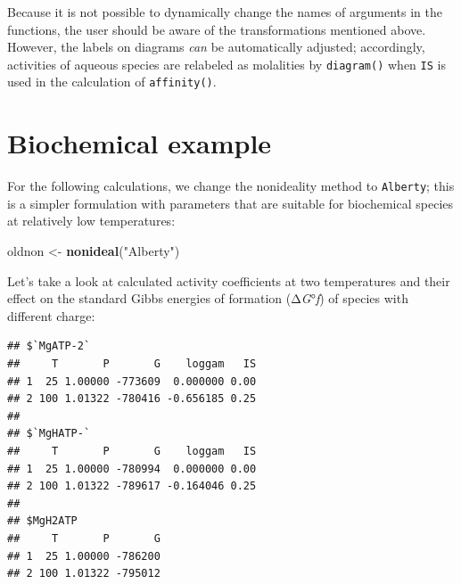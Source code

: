 \documentclass[]{tufte-book}
\newenvironment{Shaded}{}{}
\newcommand{\KeywordTok}[1]{\textcolor[rgb]{0.00,0.44,0.13}{\textbf{#1}}}
\newcommand{\DataTypeTok}[1]{\textcolor[rgb]{0.56,0.13,0.00}{#1}}
\newcommand{\DecValTok}[1]{\textcolor[rgb]{0.25,0.63,0.44}{#1}}
\newcommand{\FloatTok}[1]{\textcolor[rgb]{0.25,0.63,0.44}{#1}}
\newcommand{\StringTok}[1]{\textcolor[rgb]{0.25,0.44,0.63}{#1}}
\newcommand{\OperatorTok}[1]{\textcolor[rgb]{0.40,0.40,0.40}{#1}}
\newcommand{\NormalTok}[1]{#1}
\begin{document}
Because it is not possible to dynamically change the names of arguments
in the functions, the user should be aware of the transformations
mentioned above. However, the labels on diagrams \emph{can} be
automatically adjusted; accordingly, activities of aqueous species are
relabeled as molalities by {\texttt{diagram()}} when \texttt{IS} is used
in the calculation of {\texttt{affinity()}}.

\section{Biochemical example}\label{biochemical-example}

For the following calculations, we change the nonideality method to
\texttt{Alberty}; this is a simpler formulation with parameters that are
suitable for biochemical species at relatively low temperatures:

\begin{Shaded}
\begin{Highlighting}[]
\NormalTok{oldnon <-}\StringTok{ }\KeywordTok{nonideal}\NormalTok{(}\StringTok{"Alberty"}\NormalTok{)}
\end{Highlighting}
\end{Shaded}

Let's take a look at calculated activity coefficients at two
temperatures and their effect on the standard Gibbs energies of
formation (Δ\emph{G}°\emph{f}) of species with different charge:

\begin{Shaded}
\end{Shaded}

\begin{verbatim}
## $`MgATP-2`
##     T       P       G    loggam   IS
## 1  25 1.00000 -773609  0.000000 0.00
## 2 100 1.01322 -780416 -0.656185 0.25
## 
## $`MgHATP-`
##     T       P       G    loggam   IS
## 1  25 1.00000 -780994  0.000000 0.00
## 2 100 1.01322 -789617 -0.164046 0.25
## 
## $MgH2ATP
##     T       P       G
## 1  25 1.00000 -786200
## 2 100 1.01322 -795012
\end{verbatim}
\end{document}
